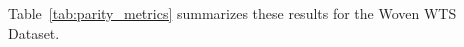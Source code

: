 \documentclass[5p,times]{elsarticle}
\begin{document}
Table~\ref{tab:parity_metrics} summarizes these results for the Woven WTS Dataset.

\end{document}
